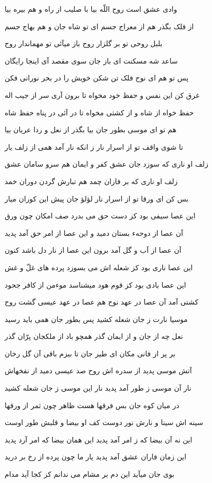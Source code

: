 وادى عشق است روح اللّه بيا
با صليب از راه و هم بيره بيا

از فلک بگذر هم از معراج جسم
اى تو شاه جان و هم بهاج جسم

بلبل روحى تو بر گلزار روح
باز ميآئى تو مهماندار روح

ساعد شه مسکنت اى باز جان
سوى مقصد آى اينجا رايگان

پس تو هم اى نوح فلک تن شکن
خويش را در بحر نورانى فکن

غرق کن اين نفس و حفظ خود مخواه
تا برون آرى سر از جيب اله

حفظ خواه از شاه و از کشتى مخواه
تا در آئى در پناه حفظ شاه

هم تو اى موسى بطور جان بيا
بگذر از نعل و ردا عريان بيا

تا شوى واقف تو از اسرار نار
ز انکه نار آمد همى از زلف يار

زلف او نارى که سوزد جان عشق
کفر و ايمان هم سرو سامان عشق

زلف او نارى که بر فاران چمد
هم تبارش گردن دوران خمد

بس کن اى ورقا تو از اسرار نار
لؤلؤ جان پيش اين کوران ميار

اين عصا سيفى بود کز دست حق
مى بدرد صف امکان چون ورق

آن عصا از دوحهء بستان دميد
و اين عصا از امر حق آمد پديد

آن عصا از آب و گل آمد برون
اين عصا از نار دل باشد کنون

اين عصا نارى بود کز شعله اش
مى بسوزد پرده هاى غلّ و غش

اين عصا بادى بود کز قوم هود
ميشناسد موءمن از کافر جحود

کشتى آمد آن عصا در عهد نوح
هم عصا در عهد عيسى گشت روح

موسيا نارت ز جان شعله کشيد
پس بطور جان همى بايد رسيد

نعل چه از جان و از ايمان گذر
همچو باد از ملک‍جان پرّان گذر

بر پر از فانى مکان اى طير جان
تا ببزم باقى آن گل رخان

آتش موسى پديد از سدره اش
روح صد عيسى دميد از نفخهاش

نار آن موسى ز طور آمد پديد
نار اين موسى ز جان شعله کشيد

در ميان کوه جان بس فرقها
هست ظاهر چون ثمر از ورقها

سينه اش سينا و نارش نور دوست
کف او بيضا و قلبش طور اوست

اين نه آن بيضا که ز امر آمد پديد
اين همان بيضا که امر آرد پديد

اين زمان فاران عشق آمد پديد
يار ما چون پرده از رخ بر دريد

بوى جان ميآيد اين دم بر مشام
مى ندانم کز کجا آيد مدام


